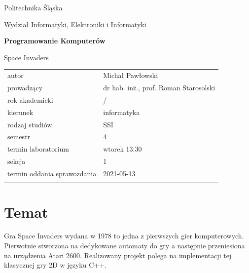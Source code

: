 \documentclass[12pt,a4paper]{article}
\newcounter{rok}
\newcommand{\rokakademicki}{%
   \setcounter{rok}{\number\year}%
   \ifthenelse{\number\month<10}%
   {\addtocounter{rok}{-1}}%
   {}%
   \arabic{rok}/\addtocounter{rok}{1}\arabic{rok}
}
\begin{document}
\frenchspacing
\thispagestyle{empty}
\begin{center}
{\Large\sf Politechnika Śląska   %

Wydział Informatyki, Elektroniki i Informatyki

}

\vfill

 

\vfill\vfill

{\Huge\sffamily\bfseries Programowanie Komputerów\par}  

\vfill\vfill

{\LARGE\sf Space Invaders}   


\vfill \vfill\vfill\vfill






\begin{tabular}{ll}
	\toprule
	autor                       & Michał Pawłowski    \\
	prowadzący                  &  dr hab. inż., prof. Roman Starosolski   \\
	rok akademicki              & \rokakademicki         \\
	kierunek                    & informatyka            \\
	rodzaj studiów              & SSI                    \\
	semestr                     & 4                      \\
	termin laboratorium         & wtorek 13:30\\
	sekcja                      & 1                    \\
	termin oddania sprawozdania & 2021-05-13            \\
	\bottomrule
	                            &
\end{tabular}

\end{center}

\cleardoublepage

\section{Temat}
Gra Space Invaders wydana w 1978 to jedna z pierwszych gier komputerowych. Pierwotnie stworzona na dedykowane automaty do gry a następnie przeniesiona na urządzenia Atari 2600. Realizowany projekt polega na implementacji tej klasycznej gry 2D w języku C++.
\end{document}
